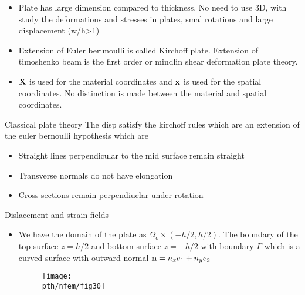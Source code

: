 	\begin{frame}
		\begin{itemize}
			\item Plate has large dimension compared to thickness. No need to use 3D, with study the deformations and stresses in plates, smal rotations and large displacement (w/h>1)
			\item Extension of Euler berunoulli is called Kirchoff plate. Extension of timoshenko beam is the first order or mindlin shear deformation plate theory.
			\item $\mathbf{X}$ is used for the material coordinates and $\mathbf{x}$ is used for the spatial coordinates. No distinction is made between the material and spatial coordinates. 	
		\end{itemize}
	\end{frame}


	\begin{frame}{Classical plate theory}
		The disp satisfy the kirchoff rules which are an extension of the euler bernoulli hypothesis which are
		\begin{itemize}
			\item Straight lines perpendicular to the mid surface remain straight
			\item Transverse normals do not have elongation
			\item Cross sections remain perpendiuclar under rotation
		\end{itemize}
	\end{frame}


	\begin{frame}{Dislacement and strain fields}
		\begin{itemize}
			\item We have the domain of the plate as $\Omega_o \times (-h/2,h/2)$. The boundary of the top surface $z = h/2$ and bottom surface $z = -h/2$ with boundary $\Gamma$ which is a curved surface with outward normal $\mathbf{n} = n_xe_1 + n_ye_2$
			\begin{figure}
				\centering
				\texttt{[image: \\pth/nfem/fig30]} 		
			\end{figure}
		\end{itemize}
	\end{frame}


